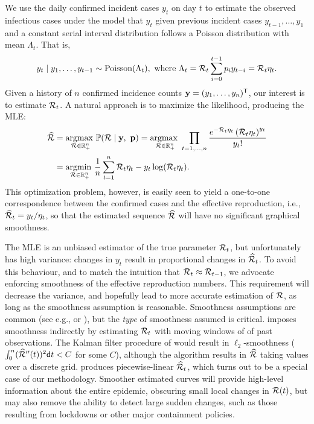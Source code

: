 We use the daily confirmed incident cases $y_t$ on day $t$ to estimate the
observed infectious cases under the model that $y_t$ given previous incident
cases $y_{t-1},\ldots,y_1$ and a constant serial interval distribution follows a
Poisson distribution with mean $\Lambda_t$. That is, 
$$
y_t \mid y_1,\ldots,y_{t-1} \sim \mathrm{Poisson}(\Lambda_t), \textrm{ where } \Lambda_t =  \mathcal{R}_t\sum_{i=0}^{t-1}p_i y_{t-i} = \mathcal{R}_t\eta_t.$$ 
Given a history of $n$ confirmed incidence counts $\mathbf{y} = (y_1,\ldots,y_n)^{\mathsf{T}}$,
our interest is to estimate $\mathcal{R}_t$. A natural approach is to maximize the
likelihood, producing the MLE:
\begin{equation} \label{eq:mle}
  \begin{split}
    \widehat{\mathcal{R}} &= \underset{\mathcal{R} \in \mathbb{R}_+^n}{\operatorname*{argmax}\ } \mathbb{P}(\mathcal{R} \mid \mathbf{y},\ \mathbf{p})
    = \underset{\mathcal{R} \in \mathbb{R}^n_+}{\operatorname*{argmax}\ } \prod_{t = 1,\dots,n} 
    \frac{e^{- \mathcal{R}_t \eta_t} \left(\mathcal{R}_t \eta_t\right)^{y_t} }{y_t!}\\
    &= \underset{\mathcal{R}\in\mathbb{R}^n_+}{\operatorname*{argmin}\ } \frac{1}{n}\sum_{t = 1}^n \mathcal{R}_t\eta_t - y_t\log(\mathcal{R}_t\eta_t).
  \end{split}
\end{equation}
This optimization problem, however, is easily seen to yield a one-to-one
correspondence between the confirmed cases and the effective reproduction, i.e.,
$\widehat{\mathcal{R}}_t = y_t / \eta_t$, so that the estimated sequence
$\widehat{\mathcal{R}}$ will have no significant graphical smoothness.

The MLE is an unbiased estimator of the true parameter $\mathcal{R}_t$, but
unfortunately has
high variance: changes in $y_t$ result in proportional changes in
$\widehat{\mathcal{R}}_t$. To avoid this behaviour, and to match the intuition that
$\mathcal{R}_t \approx \mathcal{R}_{t-1}$, we advocate enforcing smoothness of the effective
reproduction numbers. This requirement will decrease the variance, and hopefully
lead to more
accurate estimation of $\mathcal{R}$, as long as the smoothness assumption is
reasonable. Smoothness assumptions are common (see e.g.,
\citet{parag2021improved} or \citet{gostic2020practical}), but the \emph{type}
of smoothness assumed is critical. \citet{cori2020package} imposes smoothness
indirectly by estimating $\mathcal{R}_t$ with moving windows of of past observations.
The Kalman filter procedure of \citet{parag2021improved} would result in 
$\ell_2$-smoothness ($\int_0^n (\widehat{\mathcal{R}}''(t))^{2}\mathsf{d} t < C$ for some $C$),
although the algorithm results in $\widehat{\mathcal{R}}$ taking values
over a discrete grid. \citet{pascal2022nonsmooth} produces
piecewise-linear $\widehat{\mathcal{R}}_t$, which turns out to be a special case of
our methodology.
Smoother estimated curves will provide high-level information about the
entire epidemic, obscuring small local changes in $\mathcal{R}(t)$, but may also remove
the ability to detect large sudden changes, such as those resulting from
lockdowns or other major containment policies. 

